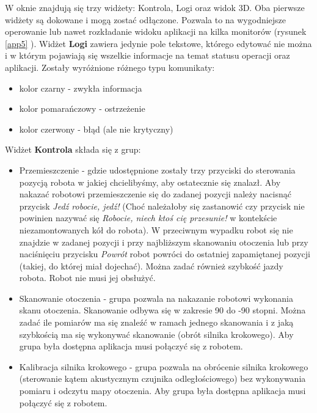 \documentclass[a4paper]{article}
\begin{document}
W oknie znajdują się trzy widżety: Kontrola, Logi oraz widok 3D. Oba pierwsze widżety są dokowane i mogą zostać odłączone. Pozwala to na wygodniejsze operowanie lub nawet rozkładanie widoku aplikacji na kilka monitorów (rysunek \ref{app5} ). Widżet \textbf{Logi} zawiera jedynie pole tekstowe, którego edytować nie można i w którym pojawiają się wszelkie informacje na temat statusu operacji oraz aplikacji. Zostały wyróżnione różnego typu komunikaty:
\begin{itemize}
\item kolor czarny - zwykła informacja
\item kolor pomarańczowy - ostrzeżenie
\item kolor czerwony - błąd (ale nie krytyczny)
\end{itemize}
Widżet \textbf{Kontrola} składa się z grup:
\begin{itemize}
\item Przemieszczenie - gdzie udostępnione zostały trzy przyciski do sterowania pozycją robota w jakiej chcielibyśmy, aby ostatecznie się znalazł. Aby nakazać robotowi przemieszczenie się do zadanej pozycji należy nacisnąć przycisk \textit{Jedź robocie, jedź!} (Choć należałoby się zastanowić czy przycisk nie powinien nazywać się \textit{Robocie, niech ktoś cię przesunie!} w kontekście niezamontowanych kół do robota). W przeciwnym wypadku robot się nie znajdzie w zadanej pozycji i przy najbliższym skanowaniu otoczenia lub przy naciśnięciu przycisku \textit{Powrót} robot powróci do ostatniej zapamiętanej pozycji (takiej, do której miał dojechać). Można zadać również szybkość jazdy robota. Robot nie musi jej obsłużyć.
\item Skanowanie otoczenia - grupa pozwala na nakazanie robotowi wykonania skanu otoczenia. Skanowanie odbywa się w zakresie 90 do -90 stopni. Można zadać ile pomiarów ma się znaleźć w ramach jednego skanowania i z jaką szybkością ma się wykonywać skanowanie (obrót silnika krokowego). Aby grupa była dostępna aplikacja musi połączyć się z robotem. 
\item Kalibracja silnika krokowego - grupa pozwala na obrócenie silnika krokowego (sterowanie kątem akustycznym czujnika odległościowego) bez wykonywania pomiaru i odczytu mapy otoczenia. Aby grupa była dostępna aplikacja musi połączyć się z robotem.
\end{itemize}
\end{document}
